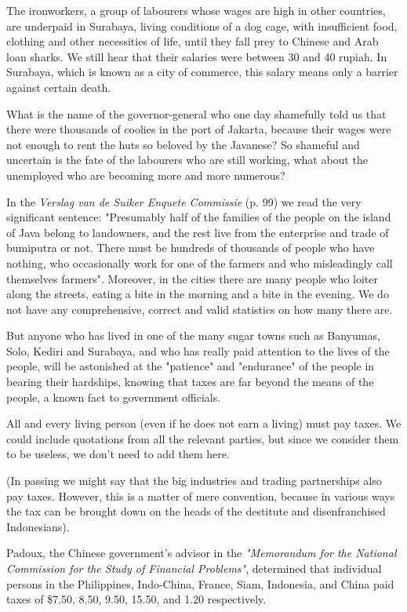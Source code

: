 The ironworkers, a group of labourers whose wages are high in other countries, 
are underpaid in Surabaya, living conditions of a dog cage, with insufficient food, 
clothing and other necessities of life, until they fall prey to Chinese and Arab loan sharks. 
We still hear that their salaries were between 30 and 40 rupiah. In Surabaya, which is known as 
a city of commerce, this salary means only a barrier against certain death.\vskip 0.2in

What is the name of the governor-general who one day shamefully told us that there were 
thousands of coolies in the port of Jakarta, because their wages were not enough to rent 
the huts so beloved by the Javanese? So shameful and uncertain is the fate of the labourers 
who are still working, what about the unemployed who are becoming more and more numerous?\vskip 0.2in

In the \emph{Verslag van de Suiker Enquete Commissie} (p. 99) we read the very significant sentence: 
"Presumably half of the families of the people on the island of Java belong to landowners, 
and the rest live from the enterprise and trade of bumiputra or not. There must be 
hundreds of thousands of people who have nothing, who occasionally work for one of 
the farmers and who misleadingly call themselves farmers". Moreover, in the cities 
there are many people who loiter along the streets, eating a bite in the morning and 
a bite in the evening. We do not have any comprehensive, correct and valid statistics on how many there are.\vskip 0.2in

But anyone who has lived in one of the many sugar towns such as Banyumas, Solo, Kediri 
and Surabaya, and who has really paid attention to the lives of the people, will be 
astonished at the "patience" and "endurance" of the people in bearing their hardships, 
knowing that taxes are far beyond the means of the people, a known fact to government officials.\vskip 0.2in

All and every living person (even if he does not earn a living) must pay taxes. 
We could include quotations from all the relevant parties, but since we consider them to be useless, we don't need to add them here.\vskip 0.2in

(In passing we might say that the big industries and trading partnerships also pay taxes. 
However, this is a matter of mere convention, because in various ways the tax can be brought 
down on the heads of the destitute and disenfranchised Indonesians).\vskip 0.2in

Padoux, the Chinese government's advisor in the \emph{"Memorandum for the National Commission 
for the Study of Financial Problems"}, determined that individual persons in the Philippines, 
Indo-China, France, Siam, Indonesia, and China paid taxes of \$7.50, 8.50, 9.50, 15.50, and 1.20 respectively.\vskip 0.2in

